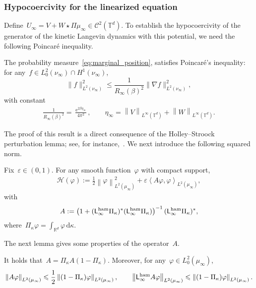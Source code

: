 \documentclass[onefignum,onetabnum]{siamart251216} %
\DeclareMathOperator{\e}{e}
\renewcommand{\d}{\mathrm{d}}
\newcommand{\norm}[1]{\left\lVert#1\right\rVert}
\newcommand{\torus}{\mathbb T}
\newcommand{\real}{\mathbb R}
\newcommand{\mc}[1]{\mathcal{#1}}
\renewcommand{\leq}{\leqslant}
\newcommand{\mescin}{\mu}
\newcommand{\mespos}{\nu}
\newcommand{\mesvit}{\kappa}
\newcommand{\poinccu}{R_{\infty}(\beta)}
\newcommand{\normT}[1]{\norm{#1}_{L^\infty(\torus^d)}}
\newcommand{\projp}{\Pi}
\newcommand{\projvit}{\Pi_{\kappa}}
\newcommand{\Lham}{\mathsf{L}^{\rm{ham}}}
\newcommand{\slangle}[1]{\left\langle #1 \right\rangle}
\newcommand{\norml}[1]{\norm{#1}_{L^2(\mescin_\infty)}}
\newcommand{\scal}[1]{\slangle{#1}_{L^2(\mescin_\infty)}}
\newcommand{\eps}{\varepsilon}
\theoremstyle{plain}
\numberwithin{equation}{section}
\numberwithin{theorem}{section}
\newcounter{ucounter}
\newcommand{\uv}[1]{
  \stepcounter{ucounter}
  \textcolor{orange}{
      \\[.2cm]
    U, comment \arabic{ucounter}. #1
    \\[.2cm]
  }
}
\renewcommand{\uv}[1]{\textcolor{orange}{#1}}
\begin{document}
\subsubsection{Hypocoercivity for the linearized equation}
\label{subsub:hypo_lin}
Define~$U_\infty = V + W \star \projp\mescin_\infty \in \mc{C}^2(\torus^d)$. %
To establish the hypocoercivity of the generator of the kinetic Langevin dynamics with this potential, we need the following Poincar\'{e} inequality.
\begin{lemma}
    \label{lem:poincare_mean_field}
    The probability measure~\eqref{eq:marginal_position}, satisfies Poincar\'{e}'s inequality: for any~$f \in L_0^2(\mespos_\infty)\cap H^1(\mespos_\infty)$,
    \[
        \|f\|_{L^2(\mespos_\infty)}^2 \leq \frac{1}{\poinccu^2}\|\nabla f\|_{L^2(\mespos_\infty)}^2,
    \]
    with constant
    \begin{align}
        \label{eq:const_poinc_linearized}
        \frac{1}{\poinccu^2}= \frac{\e^{2\beta \eta_\infty}}{4\pi^2},\qquad \eta_\infty = \normT{V} + \normT{W}.
    \end{align}
\end{lemma}
The proof of this result is a direct consequence of the Holley--Stroock perturbation lemma; see, for instance,~\cite[Theorem 5.1.6]{bakry2014analysis}.
We next introduce the following squared norm.
\begin{definition}
    Fix~$\eps \in (0,1)$. For any smooth function~$\varphi$ with compact support,
    \begin{align}
        \mc{H}(\varphi) := \frac12\norml{\varphi}^2 + \eps\scal{A\varphi,\varphi},
    \end{align}
    with
    \begin{align}
        \label{eq:def_operator_A}
        A := \left(1+(\Lham_\infty\projvit)^*(\Lham_\infty\projvit)\right)^{-1}(\Lham_\infty\projvit)^*,
    \end{align}
    where~$\projvit\varphi = \int_{\real^d}\varphi\,\d \mesvit$.
\end{definition}
The next lemma gives some properties of the operator~$A$.
\begin{lemma}
    \label{lem:bound_A_hypo}
    It holds that~$A = \projvit A(1- \projvit)$. Moreover, for any~$\varphi \in L_0^2(\mescin_\infty)$,
    \begin{align*}
        \norml{A\varphi} \leq \frac12\norml{(1-\projvit)\varphi}, \qquad \norml{\Lham_\infty A\varphi}\leq \norml{(1-\projvit)\varphi}.
    \end{align*}
\end{lemma}
\end{document}
